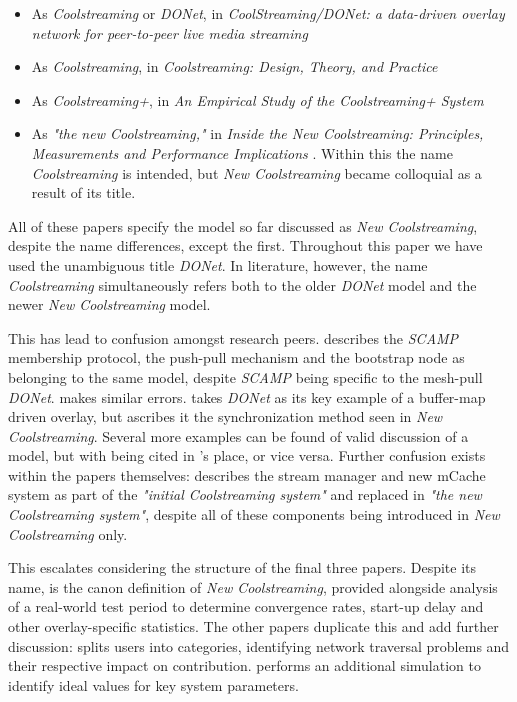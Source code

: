 \documentclass[12pt,a4paper]{article}
\begin{document}
\begin{itemize}
	\item As \textit{Coolstreaming} or \textit{DONet}, in \textit{CoolStreaming/DONet: a data-driven overlay network for peer-to-peer live media streaming} \cite{Zhang2005}
	\item As \textit{Coolstreaming}, in \textit{Coolstreaming: Design, Theory, and Practice} \cite{Xie2007}
	\item As \textit{Coolstreaming+}, in \textit{An Empirical Study of the Coolstreaming+ System} \cite{Li2007}
	\item As \textit{"the new Coolstreaming,"} in \textit{Inside the New Coolstreaming: Principles, Measurements and Performance Implications} \cite{Li2008}. Within this the name \textit{Coolstreaming} is intended, but \textit{New Coolstreaming} became colloquial as a result of its title. 
\end{itemize}

All of these papers specify the model so far discussed as \textit{New Coolstreaming}, despite the name differences, except the first. Throughout this paper we have used the unambiguous title \textit{DONet}. In literature, however, the name \textit{Coolstreaming} simultaneously refers both to the older \textit{DONet} model and the newer \textit{New Coolstreaming} model.

This has lead to confusion amongst research peers. \cite{Kondo2014} describes the \textit{SCAMP} membership protocol, the push-pull mechanism and the bootstrap node as belonging to the same model, despite \textit{SCAMP} being specific to the mesh-pull \textit{DONet}. \cite{Beraldi2010} makes similar errors. \cite{Lan2011} takes \textit{DONet} as its key example of a buffer-map driven overlay, but ascribes it the synchronization method seen in \textit{New Coolstreaming}. Several more examples can be found of valid discussion of a model, but with \cite{Xie2007} being cited in \cite{Zhang2005}'s place, or vice versa. Further confusion exists within the papers themselves:  \cite{Li2008} describes the stream manager and new mCache system as part of the \textit{"initial Coolstreaming system"} and replaced in \textit{"the new Coolstreaming system"}, despite all of these components being introduced in \textit{New Coolstreaming} only.

This escalates considering the structure of the final three papers. Despite its name, \cite{Xie2007} is the canon definition of \textit{New Coolstreaming}, provided alongside analysis of a real-world test period to determine convergence rates, start-up delay and other overlay-specific statistics. The other papers duplicate this and add further discussion: \cite{Li2007} splits users into categories, identifying network traversal problems and their respective impact on contribution. \cite{Li2008} performs an additional simulation to identify ideal values for key system parameters.
\end{document}
